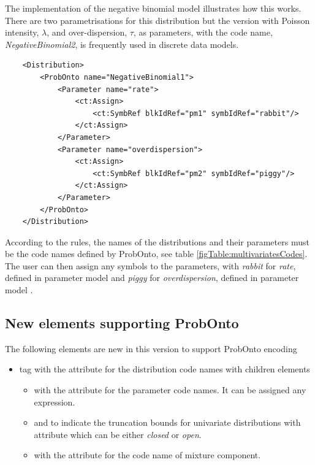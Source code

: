 \begin{example}
The implementation of the negative binomial model illustrates how this works. There are two 
parametrisations for this distribution but the version with Poisson intensity, $\lambda$, 
and over-dispersion, $\tau$, as parameters, with the code name, \emph{NegativeBinomial2}, 
is frequently used in discrete data models.
\lstset{language=XML}
\begin{lstlisting}
    <Distribution>
        <ProbOnto name="NegativeBinomial1">
            <Parameter name="rate">
                <ct:Assign>
                    <ct:SymbRef blkIdRef="pm1" symbIdRef="rabbit"/>
                </ct:Assign>
            </Parameter>
            <Parameter name="overdispersion">
                <ct:Assign>
                    <ct:SymbRef blkIdRef="pm2" symbIdRef="piggy"/>
                </ct:Assign>
            </Parameter>
        </ProbOnto>
    </Distribution>
\end{lstlisting}
%	
According to the rules, the names of the distributions and their parameters 
must be the code names defined by ProbOnto, see table \ref{figTable:multivariatesCodes}. 
The user can then assign any symbols to the parameters,
with \emph{rabbit} for \emph{rate}, defined in 
parameter model  and \emph{piggy} for \emph{overdispersion}, 
defined in parameter model .
\end{example}

\subsection{New elements supporting ProbOnto}
The following elements are new in this version to support ProbOnto encoding 
\begin{itemize}
\item
{} tag with the  attribute for the distribution code names
 with children elements
\begin{itemize}
\item
{} with the  attribute for the parameter code names. 
It can be assigned any expression.
\item
{} and  to indicate the
truncation bounds for univariate distributions with attribute  which can
be either \emph{closed} or \emph{open}.
\item
{} with the  attribute for the code name of mixture 
component.
\end{itemize}
\end{itemize}



